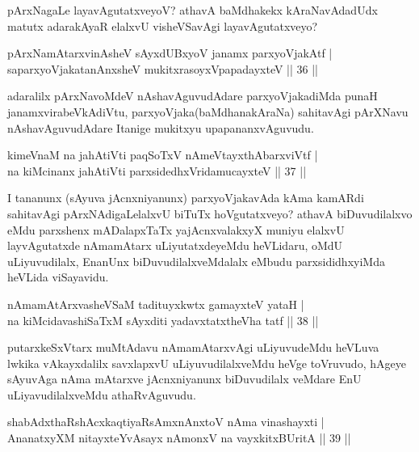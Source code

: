 \begin{artha}
pArxNagaLe layavAgutatxveyoV? athavA baMdhakekx kAraNavAdadUdx matutx adarakAyaR elalxvU 
visheVSavAgi layavAgutatxveyo?
\end{artha}

\begin{shl}
pArxNamAtarxvinAsheV sAyxdUBxyoV janamx parxyoVjakAtf |\\
saparxyoVjakatanAnxsheV mukitxrasoyxVpapadayxteV \hfill || 36 ||
\end{shl}

\begin{artha}
adaralilx pArxNavoMdeV nAshavAguvudAdare parxyoVjakadiMda punaH janamxvirabeVkAdiVtu, parxyoVjaka(baMdhanakAraNa) sahitavAgi pArXNavu nAshavAguvudAdare Itanige mukitxyu upapananxvAguvudu.
\end{artha}

\begin{shl}
kimeVnaM na ja{\null}hAtiVti paqSoTxV nAmeVtayxthAbarxviVtf |\\
na kiMcinanx ja{\null}hAtiVti parxsidedhxVridamucayxteV \hfill || 37 ||
\end{shl}

\begin{artha}
I tananunx (sAyuva jAcnxniyanunx) parxyoVjakavAda kAma kamARdi sahitavAgi pArxNAdigaLelalxvU biTuTx hoVgutatxveyo? athavA biDuvudilalxvo eMdu parxshenx mADalapxTaTx yajAcnxvalakxyX muniyu elalxvU layvAgutatxde nAmamAtarx uLiyutatxdeyeMdu heVLidaru, oMdU uLiyuvudilalx, EnanUnx biDuvudilalxveMdalalx eMbudu parxsididhxyiMda heVLida viSayavidu.
\end{artha}

\begin{shl}
nAmamAtArxvasheVSaM tadituyxkwtx gamayxteV yataH |\\
na kiMcidavashiSaTxM sAyxditi yadavxtatxtheVha tatf \hfill || 38 ||
\end{shl}

\begin{artha}
putarxkeSxVtarx muMtAdavu nAmamAtarxvAgi uLiyuvudeMdu heVLuva lwkika vAkayxdalilx savxlapxvU uLiyuvudilalxveMdu heVge toVruvudo, hAgeye sAyuvAga nAma mAtarxve jAcnxniyanunx biDuvudilalx veMdare EnU uLiyavudilalxveMdu athaRvAguvudu.
\end{artha}


\begin{shl}
shabAdxthaRshAcx\s \s kaqtiyaRsAmxnAnxtoV nAma vinashayxti |\\
AnanatxyXM nitayxteYvAsayx nAmonxV na vayxkitxBUritA \hfill || 39 ||
\end{shl}

